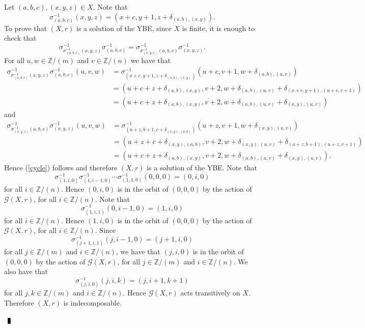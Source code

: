 \documentclass[10pt]{article}
\newcommand{\Z}{\mathbb{Z}}
\newenvironment{proof}{\par\noindent{ Proof.}}{$\qed$\par\bigskip}
\newcommand{\qed}{\enspace\vrule  height6pt  width4pt  depth2pt}
\begin{document}
\begin{proof}
    Let $(a,b,c),(x,y,z)\in X$. Note that
    $$\sigma_{(a,b,c)}^{-1}(x,y,z)=(x+c,y+1,z+\delta_{(a,b),(x,y)}).$$
    To prove that $(X,r)$ is a solution of the YBE, since $X$ is finite, it is enough to check that
    \begin{equation}\label{cycle}
    \sigma^{-1}_{\sigma^{-1}_{(a,b,c)}(x,y,z)}\sigma^{-1}_{(a,b,c)}=
    \sigma^{-1}_{\sigma^{-1}_{(x,y,z)}(a,b,c)}\sigma^{-1}_{(x,y,z)}.\end{equation}
    For all $u,w\in \mathbb{Z}/(m)$ and $v\in \mathbb{Z}/(n)$ we have that
    \begin{align*}
    \sigma^{-1}_{\sigma^{-1}_{(a,b,c)}(x,y,z)}\sigma^{-1}_{(a,b,c)}(u,v,w)
    &=\sigma^{-1}_{(x+c,y+1,z+\delta_{(a,b),(x,y)})}(u+c,v+1,w+\delta_{(a,b),(u,v)})\\
    &=(u+c+z+\delta_{(a,b),(x,y)},v+2,w+\delta_{(a,b),(u,v)}+\delta_{(x+c,y+1),(u+c,v+1)})\\
    &=(u+c+z+\delta_{(a,b),(x,y)},v+2,w+\delta_{(a,b),(u,v)}+\delta_{(x,y),(u,v)})
    \end{align*}
    and
    \begin{align*}
        \sigma^{-1}_{\sigma^{-1}_{(x,y,z)}(a,b,c)}\sigma^{-1}_{(x,y,z)}(u,v,w)
        &=\sigma^{-1}_{(a+z,b+1,c+\delta_{(x,y),(a,b)})}(u+z,v+1,w+\delta_{(x,y),(u,v)})\\
        &=(u+z+c+\delta_{(x,y),(a,b)},v+2,w+\delta_{(x,y),(u,v)}+\delta_{(a+z,b+1),(u+z,v+1)})\\
        &=(u+c+z+\delta_{(a,b),(x,y)},v+2,w+\delta_{(a,b),(u,v)}+\delta_{(x,y),(u,v)}).
    \end{align*}
    Hence (\ref{cycle}) follows and therefore $(X,r)$ is a solution of the YBE.
     Note that
     $$\sigma^{-1}_{(1,i,0)}\sigma^{-1}_{(1,i-1,0)}\cdots \sigma^{-1}_{(1,1,0)}(0,0,0)=(0,i,0)$$
     for all $i\in\Z/(n)$. Hence $(0,i,0)$ is in the orbit of $(0,0,0)$
     by the action of $\mathcal{G}(X,r)$, for all $i\in\Z/(n)$. Note that
     $$\sigma^{-1}_{(1,i,1)}(0,i-1,0)=(1,i,0)$$
     for all $i\in \Z/(n)$. Hence $(1,i,0)$ is in the orbit of $(0,0,0)$ by the action of $\mathcal{G}(X,r)$, for all $i\in\Z/(n)$. Since
     $$\sigma^{-1}_{(j+1,i,1)}(j,i-1,0)=(j+1,i,0)$$
     for all $j\in \Z/(m)$ and $i\in \Z/(n)$, we have that
     $(j,i,0)$ is in the orbit of $(0,0,0)$ by the action of $\mathcal{G}(X,r)$, for all $j\in\Z/(m)$ and $i\in\Z/(n)$.
     We also have that
     $$\sigma^{-1}_{(j,i,0)}(j,i,k)=(j,i+1,k+1)$$
     for all $j,k\in\Z/(m)$ and $i\in \Z/(n)$. Hence $\mathcal{G}(X,r)$ acts transitively on $X$. Therefore $(X,r)$ is indecomposable.


\end{proof}
\end{document}
